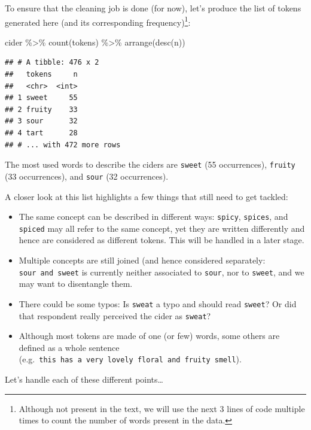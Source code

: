 \documentclass[
]{krantz}
\makeatletter
\newenvironment{Shaded}{\begin{snugshade}}{\end{snugshade}}
\newcommand{\FunctionTok}[1]{\textcolor[rgb]{0,0,0}{#1}}
\newcommand{\NormalTok}[1]{#1}
\newcommand{\SpecialCharTok}[1]{\textcolor[rgb]{0,0,0}{#1}}
\providecommand{\tightlist}{%
  \setlength{\itemsep}{0pt}\setlength{\parskip}{0pt}}
\newenvironment{kframe}{%
\medskip{}
\setlength{\fboxsep}{.8em}
 \def\at@end@of@kframe{}%
 \ifinner\ifhmode%
  \def\at@end@of@kframe{\end{minipage}}%
  \begin{minipage}{\columnwidth}%
 \fi\fi%
 \def\FrameCommand##1{\hskip\@totalleftmargin \hskip-\fboxsep
 \colorbox{shadecolor}{##1}\hskip-\fboxsep
     \hskip-\linewidth \hskip-\@totalleftmargin \hskip\columnwidth}%
 \MakeFramed {\advance\hsize-\width
   \@totalleftmargin\z@ \linewidth\hsize
   \@setminipage}}%
 {\par\unskip\endMakeFramed%
 \at@end@of@kframe}
\renewenvironment{Shaded}{\begin{kframe}}{\end{kframe}}
\makeatother
\begin{document}
To ensure that the cleaning job is done (for now), let's produce the list of tokens generated here (and its corresponding frequency)\footnote{Although not present in the text, we will use the next 3 lines of code multiple times to count the number of words present in the data.}:

\begin{Shaded}
\begin{Highlighting}[]
\NormalTok{cider }\SpecialCharTok{\%\textgreater{}\%} 
  \FunctionTok{count}\NormalTok{(tokens) }\SpecialCharTok{\%\textgreater{}\%} 
  \FunctionTok{arrange}\NormalTok{(}\FunctionTok{desc}\NormalTok{(n))}
\end{Highlighting}
\end{Shaded}

\begin{verbatim}
## # A tibble: 476 x 2
##   tokens     n
##   <chr>  <int>
## 1 sweet     55
## 2 fruity    33
## 3 sour      32
## 4 tart      28
## # ... with 472 more rows
\end{verbatim}

The most used words to describe the ciders are \texttt{sweet} (55 occurrences), \texttt{fruity} (33 occurrences), and \texttt{sour} (32 occurrences).

A closer look at this list highlights a few things that still need to get tackled:

\begin{itemize}
\tightlist
\item
  The same concept can be described in different ways: \texttt{spicy}, \texttt{spices}, and \texttt{spiced} may all refer to the same concept, yet they are written differently and hence are considered as different tokens. This will be handled in a later stage.
\item
  Multiple concepts are still joined (and hence considered separately: \texttt{sour\ and\ sweet} is currently neither associated to \texttt{sour}, nor to \texttt{sweet}, and we may want to disentangle them.
\item
  There could be some typos: Is \texttt{sweat} a typo and should read \texttt{sweet}? Or did that respondent really perceived the cider as \texttt{sweat}?
\item
  Although most tokens are made of one (or few) words, some others are defined as a whole sentence (e.g.~\texttt{this\ has\ a\ very\ lovely\ floral\ and\ fruity\ smell}).
\end{itemize}

Let's handle each of these different points\ldots{}
\end{document}
